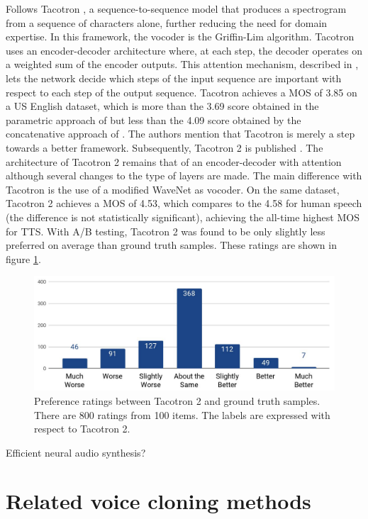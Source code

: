 \documentclass[a4paper, oneside, 12pt, english]{article}
\begin{document}
Follows Tacotron \citep{Tacotron1}, a sequence-to-sequence model that produces a spectrogram from a sequence of characters alone, further reducing the need for domain expertise. In this framework, the vocoder is the Griffin-Lim algorithm. Tacotron uses an encoder-decoder architecture where, at each step, the decoder operates on a weighted sum of the encoder outputs. This attention mechanism, described in \citep{Attention}, lets the network decide which steps of the input sequence are important with respect to each step of the output sequence. Tacotron achieves a MOS of 3.85 on a US English dataset, which is more than the 3.69 score obtained in the parametric approach of \citep{LSTM-RNN} but less than the 4.09 score obtained by the concatenative approach of \citep{ConcatenativeGoogle}. The authors mention that Tacotron is merely a step towards a better framework. Subsequently, Tacotron 2 is published \citep{Tacotron2}. The architecture of Tacotron 2 remains that of an encoder-decoder with attention although several changes to the type of layers are made. The main difference with Tacotron is the use of a modified WaveNet as vocoder. On the same dataset, Tacotron 2 achieves a MOS of 4.53, which compares to the 4.58 for human speech (the difference is not statistically significant), achieving the all-time highest MOS for TTS. With A/B testing, Tacotron 2 was found to be only slightly less preferred on average than ground truth samples. These ratings are shown in figure \ref{tacotron2_results}.

\begin{figure}[h]
	\centering
	\includegraphics[width=.8\linewidth]{images/tacotron2_results.png}
	\caption{Preference ratings between Tacotron 2 and ground truth samples. There are 800 ratings from 100 items. The labels are expressed with respect to Tacotron 2.}
	\label{tacotron2_results}
\end{figure}

\color{red} Efficient neural audio synthesis? \color{black}

\section{Related voice cloning methods}
\end{document}

